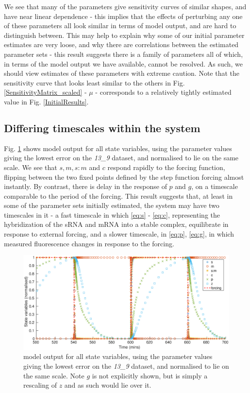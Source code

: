 \documentclass[10pt,journal]{./IEEE_latex_class/IEEEtran}
\begin{document}
We see that many of the parameters give sensitivity curves of similar shapes, and have near linear dependence - this implies that the effects of perturbing any one of these parameters all look similar in terms of model output, and are hard to distinguish between. This may help to explain why some of our initial parameter estimates are very loose, and why there are correlations between the estimated parameter sets - this result suggests there is a family of parameters all of which, in terms of the model output we have available, cannot be resolved. As such, we should view estimates of these parameters with extreme caution. Note that the sensitivity curve that looks least similar to the others in Fig. \ref{SensitivityMatrix_scaled} - $\mu$ - corresponds to a relatively tightly estimated value in Fig. \ref{InitialResults}.


 
\subsection{Differing timescales within the system}

Fig. \ref{model_output} shows model output for all state variables, using the parameter values giving the lowest error on the \textit{13\_9} dataset, and normalised to lie on the same scale. We see that $s,m,s:m$ and $c$ respond rapidly to the forcing function, flipping between the two fixed points defined by the step function forcing almost instantly. By contrast, there is delay in the response of $p$ and $g$, on a timescale comparable to the period of the forcing. This result suggests that, at least in some of the parameter sets initially estimated, the system may have two timescales in it - a fast timescale in which \eqref{eq:s} - \eqref{eq:c}, representing the hybridization of the sRNA and mRNA into a stable complex, equilibrate in response to external forcing, and a slower timescale, in \eqref{eq:p}, \eqref{eq:g}, in which measured fluorescence changes in response to the forcing.

\begin{figure}[h]	
    \centering
        \includegraphics[scale = 0.26,clip = true, trim = 90 0 60 0]{model_output}
        \caption{model output for all state variables, using the parameter values giving the lowest error on the \textit{13\_9} dataset, and normalised to lie on the same scale. Note $g$ is not explicitly shown, but is simply a rescaling of $z$ and as such would lie over it. }
        \label{model_output} 
\end{figure}
\end{document}

